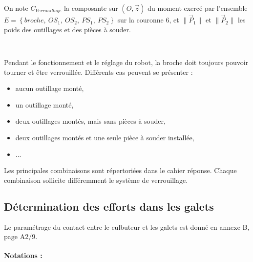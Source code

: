 On note $C_{Verrouillage}$ la composante sur $(O,\vec{z})$ du moment exercé par l’ensemble $E=\left\{broche,\ OS_1,\ OS_2,\ PS_1,\ PS_2\right\}$ sur la couronne 6, et $\|\vec{P}_1\|$ et $\|\vec{P}_2\|$ les poids des outillages et des pièces à souder.


~\

Pendant le fonctionnement et le réglage du robot, la broche doit toujours pouvoir tourner et être verrouillée. Différents cas peuvent se présenter :
\begin{itemize}
 \item aucun outillage monté,
 \item un outillage monté,
 \item deux outillages montés, mais sans pièces à souder,
 \item deux outillages montés et une seule pièce à souder installée,
 \item ...
\end{itemize}

Les principales combinaisons sont répertoriées dans le cahier réponse. Chaque combinaison sollicite différemment le système de verrouillage.




\subsection{Détermination des efforts dans les galets}

Le paramétrage du contact entre le culbuteur et les galets est donné en annexe B, page A2/9.

\paragraph{Notations :}

